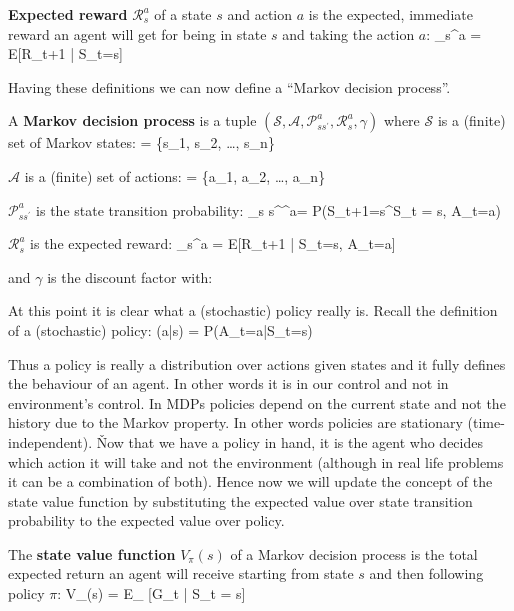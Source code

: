 \textbf{Expected reward} $\mathcal{R}_{s}^{a}$ of a state $s$ and action $a$ is the expected, immediate reward an
agent will get for being in state $s$ and taking the action $a$:
\bse
{}_{s}^{a} = E[R_{t+1} | S_t=s]
\ese
\ed

Having these definitions we can now define a ``Markov decision process''.

A \textbf{Markov decision process} is a tuple $(\mathcal{S}, \mathcal{A}, \mathcal{P}_{s s^\prime}^{a},
\mathcal{R}_{s}^{a}, \gamma)$ where $\mathcal{S}$ is a (finite) set of Markov states:
\bse
{} = \{s_1, s_2, \ldots, s_n\}
\ese

$\mathcal{A}$ is a (finite) set of actions:
\bse
{} = \{a_1, a_2, \ldots, a_n\}
\ese

$\mathcal{P}_{s s^\prime}^{a}$ is the state transition probability:
\bse
{}_{s s^\prime}^{a}= P(S_{t+1}=s^\prime \mid S_{t} = s, A_t=a)
\ese

$\mathcal{R}_{s}^{a} $ is the expected reward:
\bse
{}_{s}^{a} = E[R_{t+1} | S_t=s, A_t=a]
\ese

and $\gamma$ is the discount factor with:
\bse
\gamma \in [0,1]
\ese
\ed

At this point it is clear what a (stochastic) policy really is. Recall the definition of a (stochastic) policy:
\bse
\pi(a|s) = P(A_t=a|S_t=s)
\ese

Thus a policy is really a distribution over actions given states and it fully defines the behaviour of an agent. In
other words it is in our control and not in environment's control. In MDPs policies depend on the current state and
not the history due to the Markov property. In other words policies are stationary (time-independent). \v

Now that we have a policy in hand, it is the agent who decides which action it will take and not the environment
(although in real life problems it can be a combination of both). Hence now we will update the concept of the state
value function by substituting the expected value over state transition probability to the expected value over policy.

The \textbf{state value function } $V_{\pi}(s)$ of a Markov decision process is the total expected return an agent
will receive starting from state $s$ and then following policy $\pi$:
\bse
V_{\pi}(s) = E_{\pi} [G_t | S_t = s]
\ese
\ed

